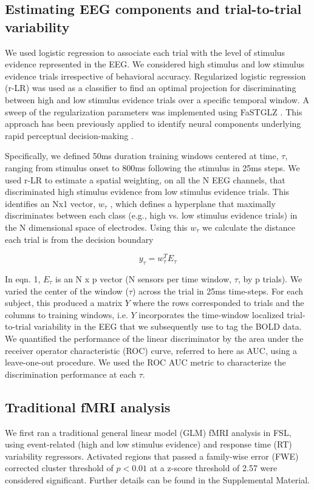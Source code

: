 \subsection*{Estimating EEG components and trial-to-trial variability}
We used logistic regression to associate each trial with the level of stimulus evidence represented in the EEG. We considered high stimulus and low stimulus evidence trials irrespective of behavioral accuracy. Regularized logistic regression (r-LR) was used as a classifier to find an optimal projection for discriminating between high and low stimulus evidence trials over a specific temporal window. A sweep of the regularization parameters was implemented using FaSTGLZ \cite{Conroy2013a}. This approach has been previously applied to identify neural components underlying rapid perceptual decision-making \cite{Goldman2009,Muraskin2015,Parra2005,Philiastides2014,Sherwin2012,Sherwin2013,Walz2013,Walz2013a}. 

Specifically, we defined 50ms duration training windows centered at time, $\tau$, ranging from stimulus onset to 800ms following the stimulus in 25ms steps. We used r-LR to estimate a spatial weighting, on all the N EEG channels, that discriminated high stimulus evidence from low stimulus evidence trials. This identifies an Nx1 vector, $w_{\tau}$ , which defines a hyperplane that maximally discriminates between each class (e.g., high vs. low stimulus evidence trials) in the N dimensional space of electrodes. Using this $w_{\tau}$ we calculate the distance each trial is from the decision boundary

\begin{equation}
    y_{\tau}=w^{T}_{\tau}E_{\tau}
\end{equation}

In eqn. 1, $E_{\tau}$ is an N x p vector (N sensors per time window, $\tau$, by p trials). We varied the center of the window ($\tau$) across the trial in 25ms time-steps. For each subject, this produced a matrix $Y$ where the rows corresponded to trials and the columns to training windows, i.e.  $Y$ incorporates the time-window localized trial-to-trial variability in the EEG that we subsequently use to tag the BOLD data. We quantified the performance of the linear discriminator by the area under the receiver operator characteristic (ROC) curve, referred to here as AUC, using a leave-one-out procedure. We used the ROC AUC metric to characterize the discrimination performance at each $\tau$. 

\subsection*{Traditional fMRI analysis}
We first ran a traditional general linear model (GLM) fMRI analysis in FSL, using event-related (high and low stimulus evidence) and response time (RT) variability regressors. Activated regions that passed a family-wise error (FWE) \cite{Nichols2003} corrected cluster threshold of $p < 0.01$ at a z-score threshold of 2.57 were considered significant. Further details can be found in the Supplemental Material. 


